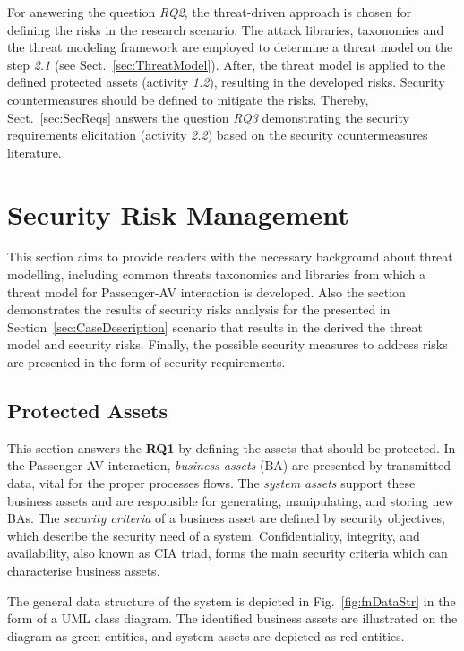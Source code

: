 \documentclass[manuscript]{acmart}
\begin{document}
For answering the question \textit{RQ2}, the threat-driven approach is chosen for defining the risks in the research scenario. The attack libraries, taxonomies and the threat modeling framework are employed to determine a threat model on the step \textit{2.1} (see Sect.~\ref{sec:ThreatModel}). After, the threat model is applied to the defined protected assets (activity \textit{1.2}), resulting in the developed risks. 
Security countermeasures should be defined to mitigate the risks. Thereby, Sect.~\ref{sec:SecReqs} answers the question \textit{RQ3} demonstrating the security requirements elicitation (activity \textit{2.2}) based on the security countermeasures literature.

\section{Security Risk Management} \label{sec:CaseAnalysis}

This section aims to provide readers with the necessary background about threat modelling, including common threats taxonomies and libraries from which a threat model for Passenger-AV interaction is developed. Also the section demonstrates the results of security risks analysis for the presented in Section~\ref{sec:CaseDescription} scenario that results in the derived the threat model and security risks. Finally, the possible security measures to address risks are presented in the form of security requirements. 

\subsection{Protected Assets} \label{sec:protectedAssets}

This section answers the \textbf{RQ1} by defining the assets that should be protected. In the Passenger-AV interaction, \textit{business assets} (BA) are presented by transmitted data, vital for the proper processes flows. The \textit{system assets} support these business assets and are responsible for generating, manipulating, and storing new BAs. The \textit{security criteria} of a business asset are defined by security objectives, which describe the security need of a system. Confidentiality, integrity, and availability, also known as CIA triad, forms the main security criteria which can characterise business assets.

The general data structure of the system is depicted in Fig.~\ref{fig:fnDataStr} in the form of a UML class diagram. The identified business assets are illustrated on the diagram as green entities, and system assets are depicted as red entities.
\end{document}
